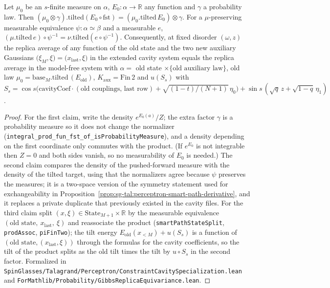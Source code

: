 \begin{lemma}\label{lem:sg-tal:perceptron-cavity-split}
  \leanok
Let $\mu_0$ be an $s$-finite measure on $\alpha$, $E_0:\alpha\to\mathbb R$ any function and $\gamma$ a probability law. Then $(\mu_0\otimes\gamma).\mathrm{tilted}(E_0\circ\mathrm{fst})=(\mu_0.\mathrm{tilted}\,E_0)\otimes\gamma$.
For a $\mu$-preserving measurable equivalence $\psi:\alpha\simeq\beta$ and a measurable $e$, $(\mu.\mathrm{tilted}\,e)\circ\psi^{-1}=\nu.\mathrm{tilted}(e\circ\psi^{-1})$.
Consequently, at fixed disorder $(\omega,z)$ the replica average of any function of the old state and the two new auxiliary Gaussians $\bigl(\xi_M,\xi\bigr)=\bigl(x_{\mathrm{last}},\xi\bigr)$ in the extended cavity system equals the replica average in the model-free system with
$\alpha=$ old state $\times\{\text{old auxiliary law}\}$, old law $\mu_0=\mathrm{base}_M.\mathrm{tilted}\,(E_{\mathrm{old}})$, $K_{\mathrm{aux}}=\mathrm{Fin}\,2$ and $u(S_s)$ with
$S_s=\cos s\bigl(\mathrm{cavityCoef}\cdot(\text{old couplings, last row})+\sqrt{(1-t)/(N+1)}\,\eta_0\bigr)+\sin s\,(\sqrt q\,z+\sqrt{1-q}\,\eta_1)$.
\end{lemma}
\begin{proof}
  \leanok
For the first claim, write the density $e^{E_0(a)}/Z$; the extra factor $\gamma$ is a probability measure so it does not change the normalizer (\texttt{integral\_prod\_fun\_fst\_of\_isProbabilityMeasure}), and a density depending on the first coordinate only commutes with the product. (If $e^{E_0}$ is not integrable then $Z=0$ and both sides vanish, so no measurability of $E_0$ is needed.)
The second claim compares the density of the pushed-forward measure with the density of the tilted target, using that the normalizers agree because $\psi$ preserves the measures; it is a two-space version of the symmetry statement used for exchangeability in Proposition~\ref{prop:sg-tal:perceptron-smart-path-derivative}, and it replaces a private duplicate that previously existed in the cavity files.
For the third claim split $(x,\xi)\in\mathrm{State}_{M+1}\times\mathbb R$ by the measurable equivalence $(\text{old state},\ x_{\mathrm{last}},\ \xi)$ and reassociate the product (\texttt{smartPathStateSplit}, \texttt{prodAssoc}, \texttt{piFinTwo}); the tilt energy $E_{\mathrm{old}}(x_{<M})+u(S_s)$ is a function of $(\text{old state},(x_{\mathrm{last}},\xi))$ through the formulas for the cavity coefficients, so the tilt of the product splits as the old tilt times the tilt by $u\circ S_s$ in the second factor.
Formalized in \texttt{SpinGlasses/Talagrand/Perceptron/ConstraintCavitySpecialization.lean} and \texttt{ForMathlib/Probability/GibbsReplicaEquivariance.lean}.
\end{proof}

